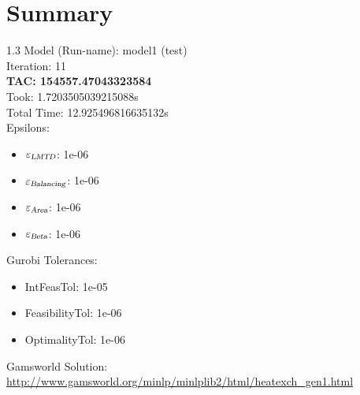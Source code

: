 \documentclass{article}%
\begin{document}
%
\normalsize%
\section{Summary}%
\thispagestyle{plain}%
\begin{spacing}{1.3}%
\Large%
Model (Run-name): model1 (test)\\%
Iteration: 11\\%
\textbf{TAC: 154557.47043323584}\\%
Took: 1.7203505039215088s\\%
Total Time: 12.925496816635132s\\%
Epsilons:%
\begin{itemize}%
	\item $\varepsilon_{\textsl{LMTD}}$: 1e-06%
	\item $\varepsilon_{\textsl{Balancing}}$: 1e-06%
	\item $\varepsilon_{\textsl{Area}}$: 1e-06%
	\item $\varepsilon_{\textsl{Beta}}$: 1e-06%
\end{itemize}%
Gurobi Tolerances:%
\begin{itemize}%
	\item IntFeasTol: 1e-05%
	\item FeasibilityTol: 1e-06%
	\item OptimalityTol: 1e-06%
\end{itemize}%
\end{spacing}%
\normalsize%
Gamsworld Solution: \url{http://www.gamsworld.org/minlp/minlplib2/html/heatexch_gen1.html}%
%
\clearpage%
\end{document}
